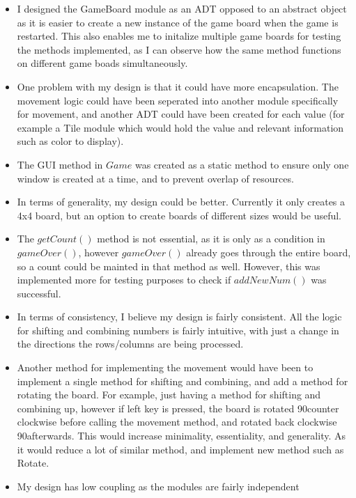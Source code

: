 \documentclass[12pt]{article}
\begin{document}
\begin{itemize}
    \item I designed the GameBoard module as an ADT opposed to an abstract
    object as it is easier to create a new instance of the game board when
    the game is restarted. This also enables me to initalize multiple game
    boards for testing the methods implemented, as I can observe how the
    same method functions on different game boads simultaneously.
    \item One problem with my design is that it could have more
    encapsulation. The movement logic could have been seperated into
    another module specifically for movement, and another ADT could have
    been created for each value (for example a Tile module which would hold
    the value and relevant information such as color to display).
    \item The GUI method in $Game$ was created as a static method to ensure
    only one window is created at a time, and to prevent overlap of resources.
    \item In terms of generality, my design could be better. Currently it
    only creates a 4x4 board, but an option to create boards of different
    sizes would be useful. 
    \item The $getCount()$ method is not essential, as it is only as a
    condition in $gameOver()$, however $gameOver()$ already goes through
    the entire board, so a count could be mainted in that method as well.
    However, this was implemented more for testing purposes to check if
    $addNewNum()$ was successful.
    \item In terms of consistency, I believe my design is fairly
    consistent. All the logic for shifting and combining numbers is fairly
    intuitive, with just a change in the directions the rows/columns are
    being processed.
    \item Another method for implementing the movement would have been to
    implement a single method for shifting and combining, and add a method
    for rotating the board. For example, just having a method for shifting
    and combining up, however if left key is pressed, the board is rotated
    90\textdegree counter clockwise before calling the movement method, and
    rotated back clockwise 90\textdegree afterwards. This would increase
    minimality, essentiality, and generality. As it would reduce a lot of
    similar method, and implement new method such as Rotate. 
    \item My design has low coupling as the modules are fairly independent

\end{itemize}
\end{document}
